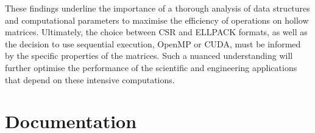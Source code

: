 \documentclass[12pt,oneside]{book} %
\begin{document}
These findings underline the importance of a thorough analysis of data
structures and computational parameters to maximise the efficiency of
operations on hollow matrices. Ultimately, the choice between CSR and ELLPACK
formats, as well as the decision to use sequential execution, OpenMP or CUDA,
must be informed by the specific properties of the matrices. Such a nuanced
understanding will further optimise the performance of the scientific and
engineering applications that depend on these intensive computations.




\appendix
\chapter{Documentation}
\end{document}
